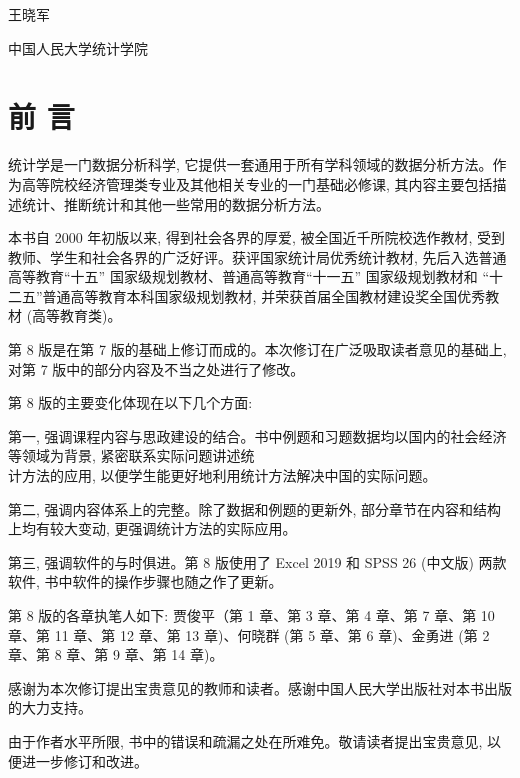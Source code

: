 \documentclass[10pt]{article}
\begin{document}
\begin{CJK*}{UTF8}{bsmi}
王晓军

中国人民大学统计学院

\section*{前 言}
统计学是一门数据分析科学, 它提供一套通用于所有学科领域的数据分析方法。作为高等院校经济管理类专业及其他相关专业的一门基础必修课, 其内容主要包括描述统计、推断统计和其他一些常用的数据分析方法。

本书自 2000 年初版以来, 得到社会各界的厚爱, 被全国近千所院校选作教材, 受到教师、学生和社会各界的广泛好评。获评国家统计局优秀统计教材, 先后入选普通高等教育“十五” 国家级规划教材、普通高等教育“十一五” 国家级规划教材和 “十二五”普通高等教育本科国家级规划教材, 并荣获首届全国教材建设奖全国优秀教材 (高等教育类)。

第 8 版是在第 7 版的基础上修订而成的。本次修订在广泛吸取读者意见的基础上, 对第 7 版中的部分内容及不当之处进行了修改。

第 8 版的主要变化体现在以下几个方面:

第一, 强调课程内容与思政建设的结合。书中例题和习题数据均以国内的社会经济等领域为背景, 紧密联系实际问题讲述统\\
计方法的应用, 以便学生能更好地利用统计方法解决中国的实际问题。

第二, 强调内容体系上的完整。除了数据和例题的更新外, 部分章节在内容和结构上均有较大变动, 更强调统计方法的实际应用。

第三, 强调软件的与时俱进。第 8 版使用了 Excel 2019 和 SPSS 26 (中文版) 两款软件, 书中软件的操作步骤也随之作了更新。

第 8 版的各章执笔人如下: 贾俊平（第 1 章、第 3 章、第 4 章、第 7 章、第 10 章、第 11 章、第 12 章、第 13 章)、何晓群 (第 5 章、第 6 章)、金勇进 (第 2 章、第 8 章、第 9 章、第 14 章)。

感谢为本次修订提出宝贵意见的教师和读者。感谢中国人民大学出版社对本书出版的大力支持。

由于作者水平所限, 书中的错误和疏漏之处在所难免。敬请读者提出宝贵意见, 以便进一步修订和改进。


\end{CJK*}
\end{document}
